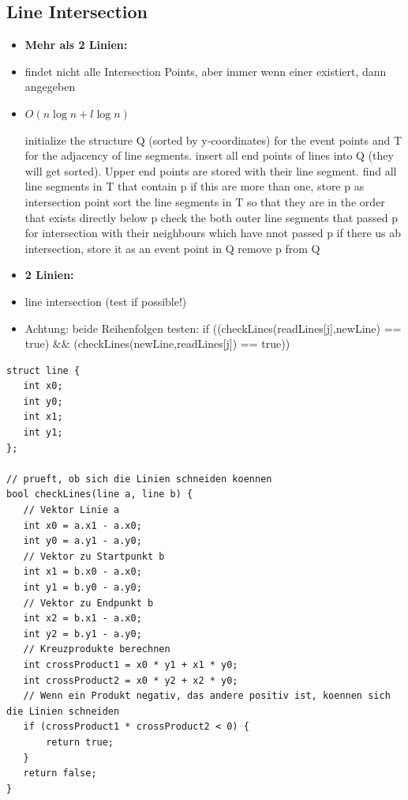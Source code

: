 \documentclass[10pt,a4paper,ngerman,oneside,]{article}
\begin{document}
\begin{multicols}{2}
\subsection{Line Intersection}
	\begin{itemize}
		\item \textbf{Mehr als 2 Linien:}
		\item findet nicht alle Intersection Points, aber immer wenn einer existiert, dann angegeben
		\item $O(n\log n + l \log n)$
		\begin{algorithm}
			\begin{algorithmic}[1]
			\STATE initialize the structure Q (sorted by y-coordinates) for the event points and T for the adjacency of line segments.
			\STATE insert all end points of lines into Q (they will get sorted). Upper end points are stored with their line segment.
				\STATE find all line segments in T that contain p
				\STATE if this are more than one, store p as intersection point
				\STATE sort the line segments in T so that they are in the order that exists directly below p
				\STATE check the both outer line segments that passed p for intersection with their neighbours which have nnot passed p
				\STATE if there us ab intersection, store it as an event point in Q
				\STATE remove p from Q
			\ENDWHILE
			\end{algorithmic}
		\end{algorithm}
		\item \textbf{2 Linien:}
		\item line intersection (test if possible!)
		\item Achtung: beide Reihenfolgen testen:
		    if ((checkLines(readLines[j],newLine) == true) $\&\&$ (checkLines(newLine,readLines[j]) == true))
	\end{itemize}
		\lstset{language=c}
			\begin{lstlisting}
struct line {
   int x0;
   int y0;
   int x1;
   int y1;
};

// prueft, ob sich die Linien schneiden koennen
bool checkLines(line a, line b) {
   // Vektor Linie a
   int x0 = a.x1 - a.x0;
   int y0 = a.y1 - a.y0;
   // Vektor zu Startpunkt b
   int x1 = b.x0 - a.x0;
   int y1 = b.y0 - a.y0;
   // Vektor zu Endpunkt b
   int x2 = b.x1 - a.x0;
   int y2 = b.y1 - a.y0;
   // Kreuzprodukte berechnen
   int crossProduct1 = x0 * y1 + x1 * y0;
   int crossProduct2 = x0 * y2 + x2 * y0;
   // Wenn ein Produkt negativ, das andere positiv ist, koennen sich die Linien schneiden
   if (crossProduct1 * crossProduct2 < 0) {
       return true;
   }
   return false;
}		
		\end{lstlisting}

\end{multicols}
\end{document}
